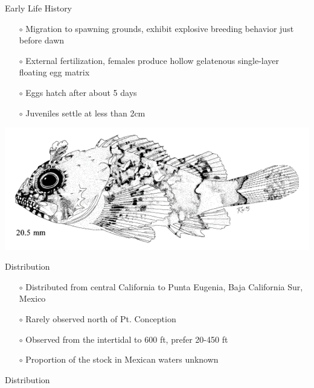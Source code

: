 \documentclass[ignorenonframetext,compress]{beamer}
\begin{document}
\begin{frame}{Early Life History}

\begin{itemize} 
\item[$\circ$] Migration to spawning grounds, exhibit explosive breeding behavior just before dawn
\item[$\circ$] External fertilization, females produce hollow gelatenous single-layer floating egg matrix
\item[$\circ$] Eggs hatch after about 5 days
\item[$\circ$] Juveniles settle at less than 2cm 
\end{itemize}

\centering
\includegraphics[width=.5\textwidth]{Figures/baby_scorp}


\end{frame}

\begin{frame}{Distribution}

\begin{itemize} 
 \item[$\circ$] Distributed from central California to Punta Eugenia, Baja California Sur, Mexico 
 \item[$\circ$] Rarely observed north of Pt. Conception  
 \item[$\circ$] Observed from the intertidal to 600 ft,  prefer 20-450 ft  
 \item[$\circ$] Proportion of the stock in Mexican waters unknown
\end{itemize}

\end{frame}

\begin{frame}{Distribution}

\end{frame}
\end{document}
